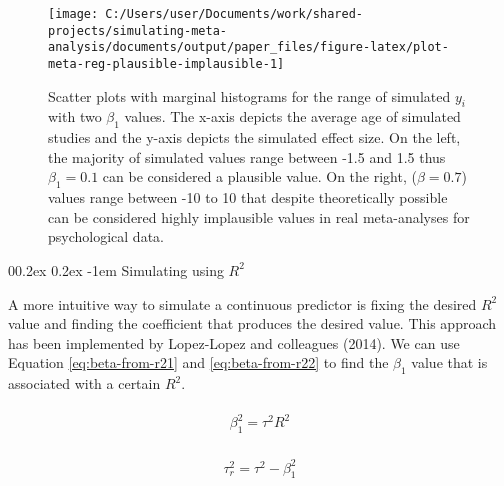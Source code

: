 \documentclass[
  man,floatsintext]{apa6}
\makeatletter
\let\oldparagraph\paragraph
\renewcommand{\paragraph}[1]{\oldparagraph{#1}\mbox{}}
\renewcommand{\paragraph}{\@startsection{paragraph}{4}{\parindent}%
  {0\baselineskip \@plus 0.2ex \@minus 0.2ex}%
  {-1em}%
  {\normalfont\normalsize\bfseries\itshape\typesectitle}}
\makeatother
\begin{document}
\normalsize

\scriptsize

\begin{figure}[H]

{\centering \texttt{[image: C:/Users/user/Documents/work/shared-projects/simulating-meta-analysis/documents/output/paper\_files/figure-latex/plot-meta-reg-plausible-implausible-1]} 

}

\caption{Scatter plots with marginal histograms for the range of simulated \(y_i\) with two \(\beta_1\) values. The x-axis depicts the average age of simulated studies and the y-axis depicts the simulated effect size. On the left, the majority of simulated values range between -1.5 and 1.5 thus \(\beta_1 = 0.1\) can be considered a plausible value. On the right, (\(\beta = 0.7\)) values range between -10 to 10 that despite theoretically possible can be considered highly implausible values in real meta-analyses for psychological data.}\label{fig:plot-meta-reg-plausible-implausible}
\end{figure}

\normalsize

\paragraph{\texorpdfstring{Simulating using \(R^2\)}{Simulating using R\^{}2}}\label{simulating-using-r2}

A more intuitive way to simulate a continuous predictor is fixing the desired \(R^{2}\) value and finding the coefficient that produces the desired value. This approach has been implemented by Lopez-Lopez and colleagues (2014). We can use Equation \eqref{eq:beta-from-r21} and \eqref{eq:beta-from-r22} to find the \(\beta_{1}\) value that is associated with a certain \(R^{2}\).

\begin{align}
\begin{aligned}
\beta^2_1 = \tau^2R^2
\label{eq:beta-from-r21}
\end{aligned}
\end{align}

\begin{align}
\begin{aligned}
\tau^2_{r} = \tau^2 - \beta^2_1
\label{eq:beta-from-r22}
\end{aligned}
\end{align}
\end{document}
